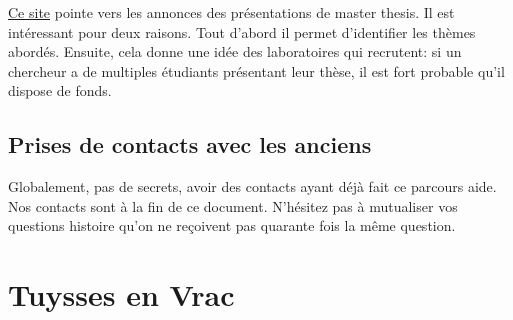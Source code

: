 \documentclass{article}
\begin{document}
\href{http://web-ext3.me.gatech.edu/aggregator/sources/5
}{Ce site} pointe vers les annonces des présentations de master thesis. Il est intéressant pour deux raisons. Tout d'abord il permet d'identifier les thèmes abordés. Ensuite, cela donne une idée des laboratoires qui recrutent: si un chercheur a de multiples étudiants présentant leur thèse, il est fort probable qu'il dispose de fonds. 


\subsection{Prises de contacts avec les anciens }
Globalement, pas de secrets, avoir des contacts ayant déjà fait ce parcours aide. Nos contacts sont à la fin de ce document. N'hésitez pas à mutualiser vos questions histoire qu'on ne reçoivent pas quarante fois la même question.


\section{Tuysses en Vrac }
\end{document}
